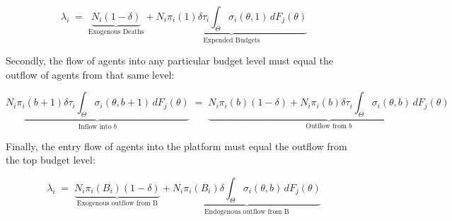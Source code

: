 \begin{equation} 
    \lambda_i \;=\; \underbrace{N_i(1-\delta)}_{\text{Exogenous Deaths}} + \underbrace{N_i \pi_i(1) \delta \tau_i \int_{\Theta}\sigma_i(\theta,1)\,dF_{j}(\theta)}_{\text{Expended Budgets}} 
\end{equation} 

Secondly, the flow of agents into any particular budget level must equal the outflow of agents from that same level: 

\begin{equation}
    \underbrace{N_i \pi_i(b+1) \delta \tau_i \int_{\Theta} \sigma_i(\theta,b+1)\,dF_{j}(\theta)}_{\text{Inflow into $b$}} \;=\; \underbrace{N_i \pi_i(b) (1-\delta) + N_i \pi_i(b) \delta \tau_i \int_{\Theta} \sigma_i(\theta,b)\,dF_{j}(\theta)}_{\text{Outflow from $b$}}
\end{equation}

Finally, the entry flow of agents into the platform must equal the outflow from the top budget level:

\begin{equation}
    \lambda_i \;=\; \underbrace{N_i \pi_i(B_i)(1-\delta)}_{\text{Exogenous outflow from B}} + \underbrace{N_i \pi_i(B_i)\delta \int_{\Theta} \sigma_i(\theta,b)\,dF_{j}(\theta)}_{\text{Endogenous outflow from B}}
\end{equation}


\begin{comment}
\begin{equation} 
    \underbrace{\lambda_m \Big( F_m(\theta'')-F_m(\theta') \Big)}_{\text{Entering Agents}}\;=\;\underbrace{(1-\delta)N^m(\sigma)}_{\text{Exogenous Deaths}}+\quad  \underbrace{\delta N^m(\sigma)  G^m_b(1 \,|\, \sigma)\int_{\Theta}\sigma_m(\theta,1)\,dG^w_\theta(\theta \,|\, \sigma)}_{\text{Expended Budgets}} 
\end{equation} 

\begin{equation}
    \underbrace{\left(\delta  \int_{\Theta}\sigma_m(\theta,b+1)\,dw_\theta(\theta \,|\, \sigma)\right)N_mR^m_{b+1}}_{\text{Transitions into budget b}}\;=\;\underbrace{\left((1-\delta)+\delta \int_{\Theta} \sigma_m(\theta,b)\,dw_\theta(\theta \,|\, \sigma)\right)N^m R^m_{b}}_{\text{Transitions out of budget b}}
\end{equation}

\begin{equation}
    \underbrace{\lambda_m \Big(F_m(\theta'')-F_m(\theta')\Big)}_{\text{Transitions into budget level B}}\;=\;\underbrace{\left((1-\delta)+\delta \int_{\Theta} \mu(\theta,b)\,dw_\theta(\theta \,|\, \sigma)\right)N_mR^m_{B}}_{\text{Transitions out of budget level B}}
\end{equation} 
\end{comment}

